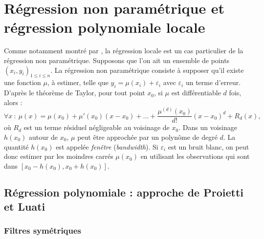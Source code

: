 \documentclass[
  12pt,
  a4paper,french]{article}
\newcommand\1{\mathds{1}}
\begin{document}
\hypertarget{sec-nonparamreg}{%
\section{Régression non paramétrique et régression polynomiale locale}\label{sec-nonparamreg}}

Comme notamment montré par \textcite{Loader1999}, la régression locale est un cas particulier de la régression non paramétrique.
Supposons que l'on ait un ensemble de points \((x_i,y_i)_{1\leq i\leq n}\).
La régression non paramétrique consiste à supposer qu'il existe une fonction \(\mu\), à estimer, telle que \(y_i=\mu(x_i)+\varepsilon_i\) avec \(\varepsilon_i\) un terme d'erreur.
D'après le théorème de Taylor, pour tout point \(x_0\), si \(\mu\) est différentiable \(d\) fois, alors :
\[
\forall x \::\:\mu(x) = \mu(x_0) + \mu'(x_0)(x-x_0)+\dots +
\frac{\mu^{(d)}(x_0)}{d!}(x-x_0)^d+R_d(x),
\]
où \(R_d\) est un terme résiduel négligeable au voisinage de \(x_0\).
Dans un voisinage \(h(x_0)\) autour de \(x_0\), \(\mu\) peut être approchée par un polynôme de degré \(d\).
La quantité \(h(x_0)\) est appelée \emph{fenêtre} (\emph{bandwidth}).
Si \(\varepsilon_i\) est un bruit blanc, on peut donc estimer par les moindres carrés \(\mu(x_0)\) en utilisant les observations qui sont dans \(\left[x_0-h(x_0),x_0+h(x_0)\right]\).

\hypertarget{sec-proietti}{%
\subsection{Régression polynomiale : approche de Proietti et Luati}\label{sec-proietti}}

\hypertarget{filtres-symuxe9triques}{%
\subsubsection{Filtres symétriques}\label{filtres-symuxe9triques}}
\end{document}
